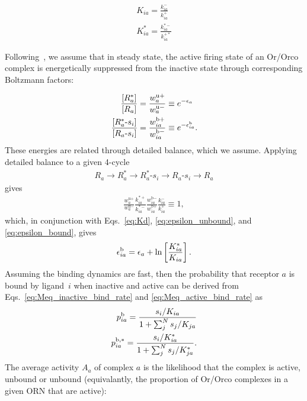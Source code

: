 \begin{align}
K_{ia} = \frac{k^-_{ia}}{k^+_{ia}} \nonumber \\
K^*_{ia} = \frac{k^{*-}_{ia}}{k^{+*}_{ia}} 
\label{eq:Kd}
\end{align}

Following~\cite{srinivas_elife}, we assume that in steady state, the active firing state of an Or/Orco complex is energetically suppressed from the inactive state through corresponding Boltzmann factors:

\begin{align}
\frac{[R^*_a]}{[R_a]} &= \frac{w^{\text{u}+}_a}{w^{\text{u}-}_a} \equiv e^{-\epsilon_a} \label{eq:epsilon_unbound} \\
\frac{[R^*_a\text{-}s_i]}{[R_a\text{-}s_i]} &= \frac{w^{\text{b}+}_{ia}}{w^{\text{b}-}_{ia}} \equiv e^{-\epsilon^{\text b}_{ia}}.\label{eq:epsilon_bound}
\end{align}
These energies are related through detailed balance, which we assume. Applying detailed balance to a given 4-cycle 
\begin{align}
R_a \rightarrow R_a^* \rightarrow R_a^*\text{-}s_i \rightarrow R_a\text{-}s_i \rightarrow R_a
\end{align}
gives
\begin{align}
\frac{w^{\text{u}+}_a}{w^{\text{u}-}_a}\frac{k^{*+}_{ia}}{k^{*-}_{ia}}\frac{w^{\text{b}-}_{ia}}{w^{\text{b}+}_{ia}}\frac{k^{-}_{ia}}{k^{+}_{ia}} \equiv 1,
\label{eq:detailed_balance}
\end{align}
which, in conjunction with Eqs.~\ref{eq:Kd}, \ref{eq:epsilon_unbound}, and \ref{eq:epsilon_bound}, gives
\begin{align}
\epsilon_{ia}^{\text b} = \epsilon_a + \ln\left[\frac{K^*_{ia}}{K_{ia}}\right].
\label{testing_equation}
\end{align}
Assuming the binding dynamics are fast, then the probability that receptor $a$ is bound by ligand~$i$ when inactive and active can be derived from  Eqs.~\ref{eq:Meq_inactive_bind_rate} and \ref{eq:Meq_active_bind_rate} as
\begin{align}
p^{\text b}_{ia} = \frac{s_i/K_{ia}}{1 + \sum_j^Ns_j/K_{ja}} \label{eq:bound_prob_ai_inactive} \\
p^{\text b, *}_{ia} = \frac{s_i/K^*_{ia}}{1 + \sum_j^Ns_j/K^*_{ja}} \label{eq:bound_prob_ai_active}.
\end{align}
The average  activity $A_a$ of complex $a$ is the likelihood that the complex is active, unbound or unbound (equivalantly, the proportion of Or/Orco complexes in a given ORN that are active):
